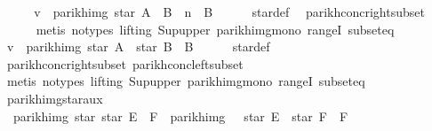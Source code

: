 \begin{isabellebody}
\ \ \isamarkupfalse%
\ \isamarkupfalse%
\ {\isachardoublequoteopen}v\ {\isasymin}\ parikh{\isacharunderscore}{\kern0pt}img\ {\isacharparenleft}{\kern0pt}star\ A\ {\isacharat}{\kern0pt}{\isacharat}{\kern0pt}\ B\ {\isacharcircum}{\kern0pt}{\isacharcircum}{\kern0pt}\ n\ {\isacharat}{\kern0pt}{\isacharat}{\kern0pt}\ B{\isacharparenright}{\kern0pt}{\isachardoublequoteclose}\isanewline
\ \ \ \ \isamarkupfalse%
\ star{\isacharunderscore}{\kern0pt}def\ \isamarkupfalse%
\ parikh{\isacharunderscore}{\kern0pt}conc{\isacharunderscore}{\kern0pt}right{\isacharunderscore}{\kern0pt}subset\isanewline
\ \ \ \ \isamarkupfalse%
\ {\isacharparenleft}{\kern0pt}metis\ {\isacharparenleft}{\kern0pt}no{\isacharunderscore}{\kern0pt}types{\isacharcomma}{\kern0pt}\ lifting{\isacharparenright}{\kern0pt}\ Sup{\isacharunderscore}{\kern0pt}upper\ parikh{\isacharunderscore}{\kern0pt}img{\isacharunderscore}{\kern0pt}mono\ rangeI\ subset{\isacharunderscore}{\kern0pt}eq{\isacharparenright}{\kern0pt}\isanewline
\ \ \isamarkupfalse%
\ \isamarkupfalse%
\ {\isachardoublequoteopen}v\ {\isasymin}\ parikh{\isacharunderscore}{\kern0pt}img\ {\isacharparenleft}{\kern0pt}star\ A\ {\isacharat}{\kern0pt}{\isacharat}{\kern0pt}\ star\ B\ {\isacharat}{\kern0pt}{\isacharat}{\kern0pt}\ B{\isacharparenright}{\kern0pt}{\isachardoublequoteclose}\isanewline
\ \ \ \ \isamarkupfalse%
\ star{\isacharunderscore}{\kern0pt}def\ \isamarkupfalse%
\ parikh{\isacharunderscore}{\kern0pt}conc{\isacharunderscore}{\kern0pt}right{\isacharunderscore}{\kern0pt}subset\ parikh{\isacharunderscore}{\kern0pt}conc{\isacharunderscore}{\kern0pt}left{\isacharunderscore}{\kern0pt}subset\isanewline
\ \ \ \ \isamarkupfalse%
\ {\isacharparenleft}{\kern0pt}metis\ {\isacharparenleft}{\kern0pt}no{\isacharunderscore}{\kern0pt}types{\isacharcomma}{\kern0pt}\ lifting{\isacharparenright}{\kern0pt}\ Sup{\isacharunderscore}{\kern0pt}upper\ parikh{\isacharunderscore}{\kern0pt}img{\isacharunderscore}{\kern0pt}mono\ rangeI\ subset{\isacharunderscore}{\kern0pt}eq{\isacharparenright}{\kern0pt}\isanewline
{}\isamarkupfalse%
%
\endisatagproof
{\isafoldproof}%
%
\isadelimproof
\isanewline
%
\endisadelimproof
\isanewline
{}\isamarkupfalse%
\ parikh{\isacharunderscore}{\kern0pt}img{\isacharunderscore}{\kern0pt}star{}{\isacharunderscore}{\kern0pt}aux{}{\isacharcolon}{\kern0pt}\isanewline
\ \ {\isachardoublequoteopen}parikh{\isacharunderscore}{\kern0pt}img\ {\isacharparenleft}{\kern0pt}star\ {\isacharparenleft}{\kern0pt}star\ E\ {\isacharat}{\kern0pt}{\isacharat}{\kern0pt}\ F{\isacharparenright}{\kern0pt}{\isacharparenright}{\kern0pt}\ {\isasymsubseteq}\ parikh{\isacharunderscore}{\kern0pt}img\ {\isacharparenleft}{\kern0pt}{\isacharbraceleft}{\kern0pt}{\isacharbrackleft}{\kern0pt}{\isacharbrackright}{\kern0pt}{\isacharbraceright}{\kern0pt}\ {\isasymunion}\ star\ E\ {\isacharat}{\kern0pt}{\isacharat}{\kern0pt}\ star\ F\ {\isacharat}{\kern0pt}{\isacharat}{\kern0pt}\ F{\isacharparenright}{\kern0pt}{\isachardoublequoteclose}\isanewline

\end{isabellebody}

